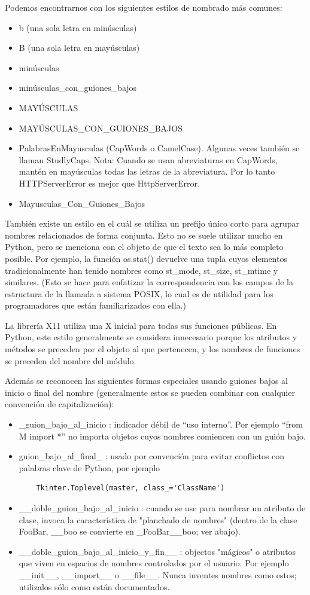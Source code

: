 \documentclass[a4paper,11pt,oneside]{book}
\begin{document}
Podemos encontrarnos con los siguientes estilos de nombrado más comunes:
\begin{itemize}
\item b (una sola letra en minúsculas)
\item B (una sola letra en mayúsculas)
\item minúsculas
\item minúsculas\_con\_guiones\_bajos
\item MAYÚSCULAS
\item MAYÚSCULAS\_CON\_GUIONES\_BAJOS
\item PalabrasEnMayusculas (CapWords o CamelCase). Algunas veces también se llaman StudlyCaps.
Nota: Cuando se usan abreviaturas en CapWords, mantén en mayúsculas todas las letras de la abreviatura. Por lo tanto HTTPServerError es mejor que HttpServerError.
\item Mayusculas\_Con\_Guiones\_Bajos
\end{itemize}
También existe un estilo en el cuál se utiliza un prefijo único corto para agrupar nombres relacionados de forma conjunta. Esto no se suele utilizar mucho en Python, pero se menciona con el objeto de que el texto sea lo más completo posible. Por ejemplo, la función os.stat() devuelve una tupla cuyos elementos tradicionalmente han tenido nombres como st\_mode, st\_size, st\_mtime y similares. (Esto se hace para enfatizar la correspondencia con los campos de la estructura de la llamada a sistema POSIX, lo cual es de utilidad para los programadores que están familiarizados con ella.)

La librería X11 utiliza una X inicial para todas sus funciones públicas. En Python, este estilo generalmente se considera innecesario porque los atributos y métodos se preceden por el objeto al que pertenecen, y los nombres de funciones se preceden del nombre del módulo.

Además se reconocen las siguientes formas especiales usando guiones bajos al inicio o final del nombre (generalmente estos se pueden combinar con cualquier convención de capitalización):
\begin{itemize}
\item \_guion\_bajo\_al\_inicio : indicador débil de ``uso interno''. Por ejemplo ``from M import *'' no importa objetos cuyos nombres comiencen con un guión bajo.
\item guion\_bajo\_al\_final\_ : usado por convención para evitar conflictos con palabras clave de Python, por ejemplo
\begin{lstlisting}
    Tkinter.Toplevel(master, class_='ClassName')
\end{lstlisting}
\item \_\_doble\_guion\_bajo\_al\_inicio : cuando se use para nombrar un atributo de clase, invoca la característica de "planchado de nombres" (dentro de la clase FooBar, \_\_boo se convierte en \_FooBar\_\_boo; ver abajo).

\item \_\_doble\_guion\_bajo\_al\_inicio\_y\_fin\_\_ : objectos "mágicos" o atributos que viven en espacios de nombres controlados por el usuario. Por ejemplo \_\_init\_\_, \_\_import\_\_ o \_\_file\_\_. Nunca inventes nombres como estos; utilizalos sólo como están documentados.
\end{itemize}
\end{document}
